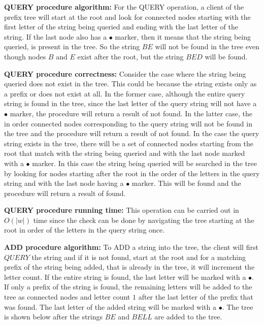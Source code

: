 \documentclass[addpoints]{exam}
\begin{document}
\begin{questions}
\textbf{QUERY procedure algorithm:} For the QUERY operation, a client of the prefix tree will start at the root and look for connected nodes starting with the first letter of the string being queried and ending with the last letter of the string. If the last node also has a $\bullet$ marker, then it means that the string being queried, is present in the tree. So the string $BE$ will not be found in the tree even though nodes $B$ and $E$ exist after the root, but the string $BED$ will be found. 

\textbf{QUERY procedure correctness:} Consider the case where the string being queried does not exist in the tree. This could be because the string exists only as a prefix or does not exist at all. In the former case, although the entire query string is found in the tree, since the last letter of the query string will not have a $\bullet$ marker, the procedure will return a result of not found. In the latter case, the in order connected nodes corresponding to the query string will not be found in the tree and the procedure will return a result of not found. In the case the query string exists in the tree, there will be a set of connected nodes starting from the root that match with the string being queried and with the last node marked with a $\bullet$ marker. In this case the string being queried will be searched in the tree by looking for nodes starting after the root in the order of the letters in the query string and with the last node having a $\bullet$ marker. This will be found and the procedure will return a result of found.

\textbf{QUERY procedure running time:} This operation can be carried out in $O(|w|)$ time since the check can be done by navigating the tree starting at the root in order of the letters in the query string once.

\textbf{ADD procedure algorithm:} To ADD a string into the tree, the client will first $QUERY$ the string and if it is not found, start at the root and for a matching prefix of the string being added, that is already in the tree, it will increment the letter count. If the entire string is found, the last letter will be marked with a $\bullet$. If only a prefix of the string is found, the remaining letters will be added to the tree as connected nodes and letter count $1$ after the last letter of the prefix that was found. The last letter of the added string will be marked with a $\bullet$. The tree is shown below after the strings $BE$ and $BELL$ are added to the tree. 


\end{questions}
\end{document}
